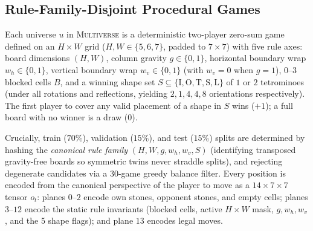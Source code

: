 \documentclass[preprint,3p,times]{elsarticle}
\begin{document}
\subsection{Rule-Family-Disjoint Procedural Games}
Each universe $u$ in \textsc{Multiverse} is a deterministic two-player zero-sum game defined on an $H \times W$ grid ($H, W \in \{5, 6, 7\}$, padded to $7 \times 7$) with five rule axes: board dimensions $(H, W)$, column gravity $g \in \{0, 1\}$, horizontal boundary wrap $w_h \in \{0, 1\}$, vertical boundary wrap $w_v \in \{0, 1\}$ (with $w_v = 0$ when $g=1$), $0$--$3$ blocked cells $B$, and a winning shape set $S \subseteq \{\mathrm{I, O, T, S, L}\}$ of $1$ or $2$ tetrominoes (under all rotations and reflections, yielding $2, 1, 4, 4, 8$ orientations respectively). The first player to cover any valid placement of a shape in $S$ wins ($+1$); a full board with no winner is a draw ($0$).

Crucially, train ($70\%$), validation ($15\%$), and test ($15\%$) splits are determined by hashing the \emph{canonical rule family} $(H, W, g, w_h, w_v, S)$ (identifying transposed gravity-free boards so symmetric twins never straddle splits), and rejecting degenerate candidates via a 30-game greedy balance filter. Every position is encoded from the canonical perspective of the player to move as a $14 \times 7 \times 7$ tensor $o_t$: planes $0$--$2$ encode own stones, opponent stones, and empty cells; planes $3$--$12$ encode the static rule invariants (blocked cells, active $H \times W$ mask, $g, w_h, w_v$, and the 5 shape flags); and plane $13$ encodes legal moves.
\end{document}
